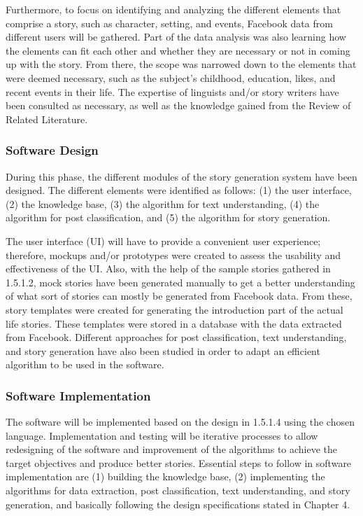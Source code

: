 Furthermore, to focus on identifying and analyzing the different elements that comprise a story, such as character, setting, and events, Facebook data from different users will be gathered. Part of the data analysis was also learning how the elements can fit each other and whether they are necessary or not in coming up with the story. From there, the scope was narrowed down to the elements that were deemed necessary, such as the subject's childhood, education, likes, and recent events in their life. The expertise of linguists and/or story writers have been consulted as necessary, as well as the knowledge gained from the Review of Related Literature.

\subsubsection{Software Design}
During this phase, the different modules of the story generation system have been designed. The different elements were identified as follows: (1) the user interface, (2) the knowledge base, (3) the algorithm for text understanding, (4) the algorithm for post classification, and (5) the algorithm for story generation.

The user interface (UI) will have to provide a convenient user experience; therefore, mockups and/or prototypes were created to assess the usability and effectiveness of the UI. Also, with the help of the sample stories gathered in 1.5.1.2, mock stories have been generated manually to get a better understanding of what sort of stories can mostly be generated from Facebook data. From these, story templates were created for generating the introduction part of the actual life stories. These templates were stored in a database with the data extracted from Facebook. Different approaches for post classification, text understanding, and story generation have also been studied in order to adapt an efficient algorithm to be used in the software. 

\subsubsection{Software Implementation}
The software will be implemented based on the design in 1.5.1.4 using the chosen language. Implementation and testing will be iterative processes to allow redesigning of the software and improvement of the algorithms to achieve the target objectives and produce better stories. Essential steps to follow in software implementation are (1) building the knowledge base, (2) implementing the algorithms for data extraction, post classification, text understanding, and story generation, and basically following the design specifications stated in Chapter 4.

